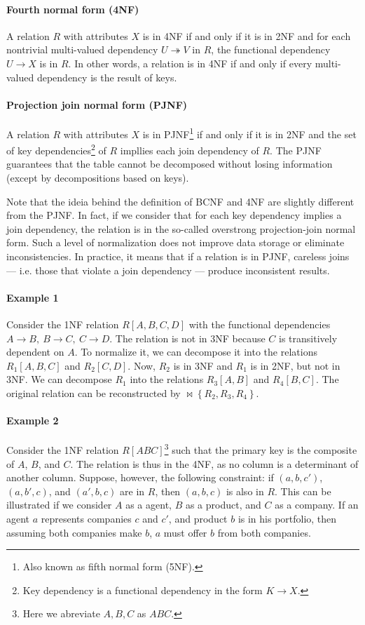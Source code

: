 \paragraph{Fourth normal form (4NF)}  A relation $R$ with attributes $X$ is in 4NF if
and only if it is in 2NF and for each nontrivial multi-valued dependency $U \twoheadrightarrow
V$ in $R$, the functional dependency $U \to X$ is in $R$.  In other words, a relation is
in 4NF if and only if every multi-valued dependency is the result of keys.

\paragraph{Projection join normal form (PJNF)} A relation $R$ with attributes $X$ is in
PJNF\footnote{Also known as fifth normal form (5NF).} if and only if it is in 2NF and
the set of key dependencies\footnote{Key dependency is a functional dependency in the form
$K \to X$.} of $R$ impllies each join dependency of $R$.  The PJNF guarantees that the
table cannot be decomposed without losing information (except by decompositions based on
keys).

Note that the ideia behind the definition of BCNF and 4NF are slightly different from the
PJNF.  In fact, if we consider that for each key dependency implies a join dependency, the
relation is in the so-called overstrong projection-join normal
form.  Such a level of normalization does not improve data storage
or eliminate inconsistencies.  In practice, it means that if a relation is in PJNF,
careless joins --- i.e. those that violate a join dependency --- produce
inconsistent results.

\paragraph{Example 1}  Consider the 1NF relation $R[A, B, C, D]$ with the functional
dependencies $A \to B,~B \to C,~C \to D$.  The relation is not in 3NF because $C$ is
transitively dependent on $A$.  To normalize it, we can decompose it into the
relations $R_1[A, B, C]$ and $R_2[C, D]$.  Now, $R_2$ is in 3NF and $R_1$ is in 2NF, but
not in 3NF.  We can decompose $R_1$ into the relations $R_3[A, B]$ and $R_4[B, C]$.
The original relation can be reconstructed by $\bowtie \left\{ R_2, R_3, R_4 \right\}$.

\paragraph{Example 2} Consider the 1NF relation $R[ABC]$\footnote{Here we abreviate ${A,
B, C}$ as $ABC$.} such that the primary key is the composite of $A$, $B$, and $C$.  The
relation is thus in the 4NF, as no column is a determinant of another column.  Suppose,
however, the following constraint: if $(a, b, c')$, $(a, b', c)$, and $(a', b, c)$ are in
$R$, then $(a, b, c)$ is also in $R$.  This can be illustrated if we consider $A$ as a
agent, $B$ as a product, and $C$ as a company.  If an agent $a$ represents companies $c$ and
$c'$, and product $b$ is in his portfolio, then assuming both companies make $b$, $a$
must offer $b$ from both companies.

